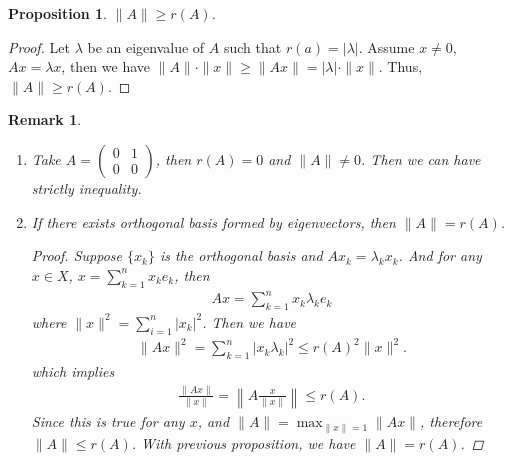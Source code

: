 \documentclass[11pt]{book}
\newtheorem{proposition}{Proposition}[section]
\newtheorem{remark}{Remark}[section]
\theoremstyle{definition}
\numberwithin{equation}{chapter}
\begin{document}
\begin{proposition}
$\|A\| \geq r(A)$.
\end{proposition}
\begin{proof}
Let $\lambda$ be an eigenvalue of $A$ such that $r(a) = \left|\lambda\right|$. Assume $x\neq 0$, $Ax = \lambda x$, then we have $\|A\|\cdot \|x\| \geq \|Ax\| = |\lambda|\cdot \|x\|$. Thus, $\|A\| \geq r(A)$.
\end{proof}

\begin{remark}
~\begin{enumerate}[label=(\arabic*)]
    \item Take $A = \begin{pmatrix}
    0 & 1  \\
    0 & 0  
    \end{pmatrix}$, then $r(A) = 0$ and $\|A\| \neq 0$. Then we can have strictly inequality.
    \item If there exists orthogonal basis formed by eigenvectors, then $\|A\| = r(A)$.
    \begin{proof}
    Suppose $\{x_k\}$ is the orthogonal basis and $Ax_k = \lambda_k x_k$. And for any $x\in X$, $x = \sum^n_{k=1}x_k e_k$, then 
    \begin{align*}
        Ax = \sum^n_{k=1} x_k \lambda_k e_k
    \end{align*}
    where $\|x\|^2 = \sum^n_{i=1}|x_k|^2$. Then we have 
    \begin{align*}
        \|Ax\|^2 = \sum^n_{k=1} |x_k \lambda_k|^2 \leq r(A)^2 \|x\|^2. 
    \end{align*} 
    which implies 
    \begin{align*}
        \frac{\|Ax\|}{\|x\|} = \left\|A \frac{x}{\|x\|}\right\| \leq r(A).
    \end{align*}
    Since this is true for any $x$, and $\|A\| = \max_{\|x\|=1}\|Ax\|$, therefore $\|A\|\leq r(A)$. With previous proposition, we have $\|A\| = r(A)$.
    \end{proof}
\end{enumerate}
\end{remark}

\medskip
\end{document}
